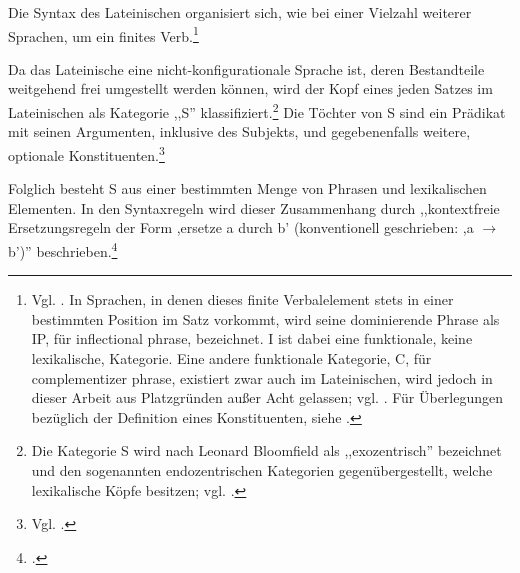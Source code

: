 \documentclass[12pt,a4paper]{article}
\begin{document}
Die Syntax des Lateinischen organisiert sich, wie bei einer Vielzahl weiterer Sprachen, um ein finites Verb.\footnote{Vgl. \cite[53]{Dal}. In Sprachen, in denen dieses finite Verbalelement stets in einer bestimmten Position im Satz vorkommt, wird seine dominierende Phrase als IP, für inflectional phrase, bezeichnet. I ist dabei eine funktionale, keine lexikalische, Kategorie. Eine andere funktionale Kategorie, C, für complementizer phrase, existiert zwar auch im Lateinischen, wird jedoch in dieser Arbeit aus Platzgründen außer Acht gelassen; vgl. \cite[46; 53; 63-5]{Dal}. Für Überlegungen bezüglich der Definition eines Konstituenten, siehe \cite[48-9]{Dal}.}

Da das Lateinische eine nicht-konfigurationale Sprache ist, deren Bestandteile weitgehend frei umgestellt werden können, wird der Kopf eines jeden Satzes im Lateinischen als Kategorie ,,S'' klassifiziert.\footnote{Die Kategorie S wird nach Leonard Bloomfield als ,,exozentrisch'' bezeichnet und den sogenannten endozentrischen Kategorien gegenübergestellt, welche lexikalische Köpfe besitzen; vgl. \cite[46]{Dal}.} Die Töchter von S sind ein Prädikat mit seinen Argumenten, inklusive des Subjekts, und gegebenenfalls weitere, optionale Konstituenten.\footnote{Vgl. \cite[64-65]{Dal}.}

Folglich besteht S aus einer bestimmten Menge von Phrasen und lexikalischen Elementen. In den Syntaxregeln wird dieser Zusammenhang durch ,,kontextfreie Ersetzungsregeln der Form ,ersetze a durch b' (konventionell geschrieben: ,a $\rightarrow$ b')'' beschrieben.\footnote{\cite[18]{Rohrer}.}
\end{document}
